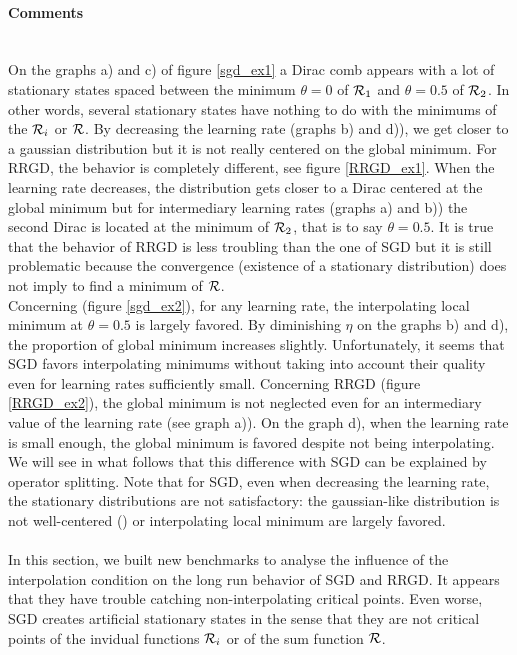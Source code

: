 \paragraph{Comments}
~~\\
On the graphs a) and c) of figure \ref{sgd_ex1} a Dirac comb appears with a lot of stationary states spaced between the minimum $\theta=0$ of $\mathcal{R}_1$ and $\theta=0.5$ of $\mathcal{R}_2$. In
other words, several stationary states have nothing to do with the minimums of the $\mathcal{R}_i$ or $\mathcal{R}$. By decreasing the learning rate (graphs b) and d)), we get closer to a gaussian
distribution but it is not really centered on the global minimum. For RRGD, the behavior is completely different, see figure \ref{RRGD_ex1}. When the learning rate decreases, the distribution gets closer to a Dirac centered at the global minimum but for intermediary learning rates (graphs a) and b)) the second Dirac is located at the minimum of $\mathcal{R}_2$, that is to say $\theta=0.5$. It is true that the behavior of RRGD is less troubling than the one of SGD but it is still problematic because the convergence (existence of a stationary distribution) does not imply to find a minimum of $\mathcal{R}$. \\
Concerning \exTwo (figure \ref{sgd_ex2}), for any learning rate, the interpolating local minimum at $\theta=0.5$ is largely favored. By diminishing $\eta$ on the graphs b) and d), the proportion of global minimum increases slightly. Unfortunately, it seems that SGD favors interpolating minimums without taking into account their quality even for learning rates sufficiently small. Concerning RRGD (figure \ref{RRGD_ex2}), the global minimum is not neglected even for an intermediary value of the learning rate (see graph a)). On the graph d), when the learning rate is small enough, the global minimum is favored despite not being interpolating. We will see in what follows that this difference with SGD can be explained by operator splitting. 
Note that for SGD, even when decreasing the learning rate, the stationary distributions are not satisfactory: the gaussian-like distribution is not well-centered (\exOne) or interpolating
local minimum are largely favored.

\paragraph{}
In this section, we built new benchmarks to analyse the influence of the interpolation condition on the long run behavior of SGD and RRGD. It appears that they have trouble catching non-interpolating critical points. Even worse, SGD creates artificial stationary states in the sense that they are not critical points of the invidual functions $\mathcal{R}_i$ or of the sum function $\mathcal{R}$.   

